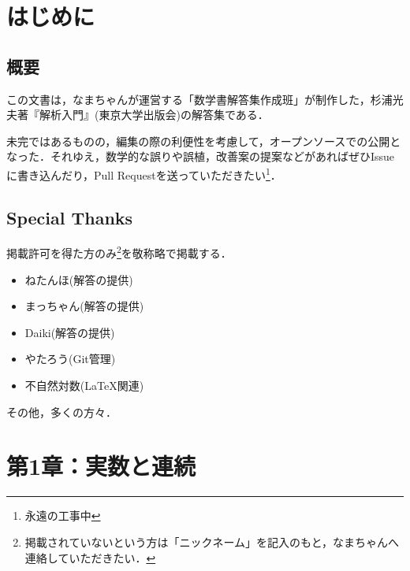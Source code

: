 \documentclass[a4paper,10pt,fleqn]{ltjsarticle}
\begin{document}


\thispagestyle{empty}

\newpage
{}
\pagecolor{white}

\begin{multicols}{3}
\tableofcontents
\end{multicols}

\newpage 

\section*{はじめに}


\subsection*{概要}

この文書は，なまちゃんが運営する「数学書解答集作成班」が制作した，杉浦光夫著『解析入門』(東京大学出版会)の解答集である．

未完ではあるものの，編集の際の利便性を考慮して，オープンソースでの公開となった．それゆえ，数学的な誤りや誤植，改善案の提案などがあればぜひIssueに書き込んだり，Pull Requestを送っていただきたい\footnote{永遠の工事中}．


\subsection*{Special Thanks}

掲載許可を得た方のみ\footnote{掲載されていないという方は「ニックネーム」を記入のもと，なまちゃんへ連絡していただきたい．}を敬称略で掲載する．
\begin{itemize}
    \item ねたんほ(解答の提供)
    \item まっちゃん(解答の提供)
    \item Daiki(解答の提供)
    \item やたろう(Git管理)
    \item 不自然対数(\LaTeX 関連)
\end{itemize}

その他，多くの方々．

\newpage 
\section*{第1章：実数と連続}
\end{document}
